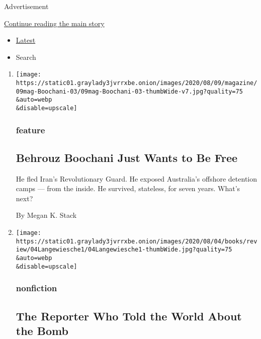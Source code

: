 Advertisement

\protect\hyperlink{after-mid1}{Continue reading the main story}

\begin{itemize}
\tightlist
\item
  \protect\hyperlink{stream-panel}{Latest}
\item
  Search
\end{itemize}

\begin{enumerate}
\def\labelenumi{\arabic{enumi}.}
\item
  \href{/2020/08/04/magazine/behrouz-boochani-australia.html}{}

  \texttt{[image: https://static01.graylady3jvrrxbe.onion/images/2020/08/09/magazine/09mag-Boochani-03/09mag-Boochani-03-thumbWide-v7.jpg?quality=75\\\&auto=webp\\\&disable=upscale]}

  \hypertarget{feature}{%
  \subsubsection{feature}\label{feature}}

  \hypertarget{behrouz-boochani-just-wants-to-be-free}{%
  \subsection{Behrouz Boochani Just Wants to Be
  Free}\label{behrouz-boochani-just-wants-to-be-free}}

  He fled Iran's Revolutionary Guard. He exposed Australia's offshore
  detention camps --- from the inside. He survived, stateless, for seven
  years. What's next?

  By Megan K. Stack
\item
  \href{/2020/08/04/books/review/fallout-hiroshima-hersey-lesley-m-m-blume.html}{}

  \texttt{[image: https://static01.graylady3jvrrxbe.onion/images/2020/08/04/books/review/04Langewiesche1/04Langewiesche1-thumbWide.jpg?quality=75\\\&auto=webp\\\&disable=upscale]}

  \hypertarget{nonfiction}{%
  \subsubsection{nonfiction}\label{nonfiction}}

  \hypertarget{the-reporter-who-told-the-world-about-the-bomb}{%
  \subsection{The Reporter Who Told the World About the
  Bomb}\label{the-reporter-who-told-the-world-about-the-bomb}}


\end{enumerate}
